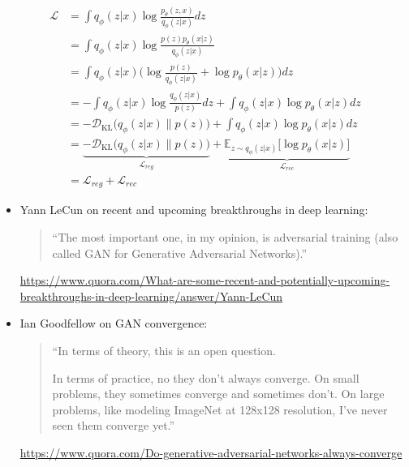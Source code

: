 \documentclass[11pt, a4paper, landscape]{article}
\begin{document}
\NewPage{}
\begin{align*}
	\mathcal{L}
	&= \int q_\phi(z|x) \log\frac{p_\theta(z,x)}{q_\phi(z|x)} dz\\
	&= \int q_\phi(z|x) \log\frac{p(z) p_\theta(x|z)}{q_\phi(z|x)}\\
	&= \int q_\phi(z|x) \bigg(\log\frac{p(z)}{q_\phi(z|x)} + \log p_\theta(x|z)\bigg) dz\\
	&= -\int q_\phi(z|x) \log\frac{q_\phi(z|x)}{p(z)} dz + \int q_\phi(z|x) \log p_\theta(x|z) dz\\
	&= -\mathcal{D}_{\mathrm{KL}}\big(q_\phi(z|x) \| p(z)\big) + \int q_\phi(z|x) \log p_\theta(x|z) dz\\
	&= \underbrace{-\mathcal{D}_{\mathrm{KL}}\big(q_\phi(z|x) \| p(z)\big)}_{\mathcal{L}_{reg}} + \underbrace{\mathbb{E}_{z \sim q_\phi(z|x)}\big[ \log p_\theta(x|z)\big]}_{\mathcal{L}_{rec}}\\
	&= \mathcal{L}_{reg} + \mathcal{L}_{rec}
\end{align*}

\NewPage{}
\vfill
\begin{itemize}
	\item Yann LeCun on recent and upcoming breakthroughs in deep learning:
	\begin{quote}
		``The most important one, in my opinion, is adversarial training (also called GAN for Generative Adversarial Networks).''
	\end{quote}
	\url{https://www.quora.com/What-are-some-recent-and-potentially-upcoming-breakthroughs-in-deep-learning/answer/Yann-LeCun}
	\item Ian Goodfellow on GAN convergence:
	\begin{quote}
		``In terms of theory, this is an open question.

		In terms of practice, no they don’t always converge. On small problems, they sometimes converge and sometimes don’t. On large problems, like modeling ImageNet at 128x128 resolution, I’ve never seen them converge yet.''
	\end{quote}
	\url{https://www.quora.com/Do-generative-adversarial-networks-always-converge}
\end{itemize}
	\vfill
\end{document}

